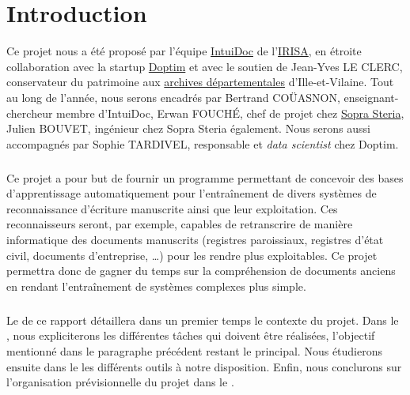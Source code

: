 \chapter{Introduction}
\setcounter{page}{1}
\pagestyle{fancy}
\fancyhf{}
\cfoot[\thepage]{\thepage}

Ce projet nous a été proposé par l’équipe \href{https://www-intuidoc.irisa.fr/}{IntuiDoc}
de l’\href{https://www.irisa.fr/}{IRISA}, en étroite collaboration avec la startup
\href{http://www.doptim.eu}{Doptim} et avec le soutien de Jean-Yves LE CLERC, conservateur du
patrimoine aux \href{http://archives.ille-et-vilaine.fr/fr}{archives départementales} d'Ille-et-Vilaine.
Tout au long de l’année, nous serons encadrés par Bertrand COÜASNON, enseignant-chercheur membre d'IntuiDoc,
Erwan FOUCHÉ, chef de projet chez \href{https://www.soprasteria.com/fr}{Sopra Steria}, Julien BOUVET,
ingénieur chez Sopra Steria également. Nous serons aussi accompagnés par Sophie TARDIVEL, responsable
et \textit{data scientist} chez Doptim.

\paragraph{}
Ce projet a pour but de fournir un programme permettant de concevoir des bases d’apprentissage
automatiquement pour l’entraînement de divers systèmes de reconnaissance d’écriture manuscrite
ainsi que leur exploitation. Ces reconnaisseurs seront, par exemple, capables de retranscrire
de manière informatique des documents manuscrits (registres paroissiaux, registres d’état civil,
documents d’entreprise, \ldots) pour les rendre plus exploitables. Ce projet permettra donc de gagner
du temps sur la compréhension de documents anciens en rendant l’entraînement de systèmes complexes
plus simple.

\paragraph{}
Le  de ce rapport détaillera dans un premier temps le contexte du projet.
Dans le , nous expliciterons les différentes tâches qui doivent être réalisées,
l’objectif mentionné dans le paragraphe précédent restant le principal. Nous étudierons ensuite dans le
 les différents outils à notre disposition. Enfin, nous conclurons sur l’organisation
prévisionnelle du projet dans le .
